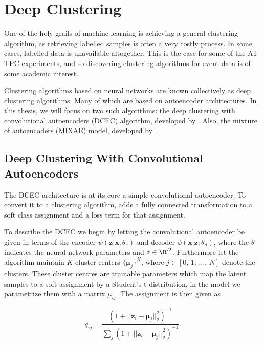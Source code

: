 \section{Deep Clustering}\label{sec:deep_clustering}

One of the holy grails of machine learning is achieving a general clustering algorithm, as retrieving labelled samples is often a very costly process. In some cases, labelled data is unavailable altogether. This is the case for some of the AT-TPC experiments, and so discovering clustering algorithms for event data is of some academic interest. 

Clustering algorithms based on neural networks are known collectively as deep clustering algorithms. Many of which are based on autoencoder architectures. In this thesis, we will focus on two such algorithms: the deep clustering with convolutional autoencoders (DCEC) algorithm, developed by \citet{Guo2017}. Also, the mixture of autoencoders (MIXAE) model, developed by \citet{Zhang}. 

\subsection{Deep Clustering With Convolutional Autoencoders}

The DCEC architecture is at its core a simple convolutional autoencoder. To convert it to a clustering algorithm, \citet{Guo2017} adds a fully connected transformation to a soft class assignment and a loss term for that assignment. 

To describe the DCEC we begin by letting the convolutional autoencoder be given in terms of the encoder $\psi(\boldsymbol{z}|\boldsymbol{x} ; \theta_e)$ and decoder $\phi(\boldsymbol{x}|\boldsymbol{z}; \theta_d)$, where the $\theta$ indicates the neural network parameters and $z \in \R^D$. Furthermore let the algorithm maintain $K$ cluster centers $\{\boldsymbol{\mu}_j\}^K$, where $j \in [0,\, 1,\, \dots,\, N]$ denote the clusters. These cluster centres are trainable parameters which map the latent samples to a soft assignment by a Student's t-distribution, in the model we parametrize them with a matrix $\mu_{ij}$. The assignment is then given as 

\begin{equation}\label{eq:qij}
q_{ij} = \frac{(1 + ||\boldsymbol{z}_i - \boldsymbol{\mu}_j||^2_2)^{-1}}{\sum_j(1 + ||\boldsymbol{z}_i - \boldsymbol{\mu}_j||^2_2)^{-1}}.
\end{equation}

